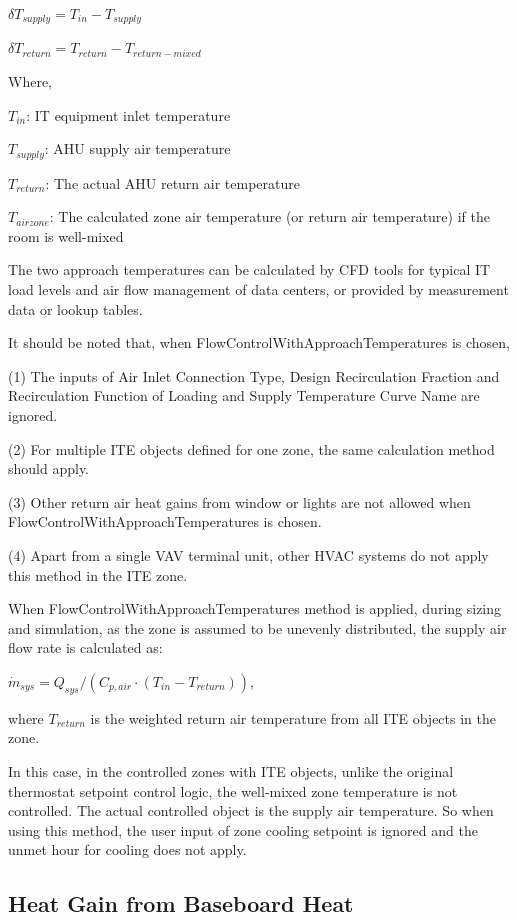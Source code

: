 $\delta T_{supply}=T_{in}-T_{supply}$

$\delta T_{return}=T_{return}-T_{return-mixed}$

Where, 

$T_{in}$: IT equipment inlet temperature

$T_{supply}$: AHU supply air temperature

$T_{return}$: The actual AHU return air temperature

$T_{airzone}$: The calculated zone air temperature (or return air temperature) if the room is well-mixed

The two approach temperatures can be calculated by CFD tools for typical IT load levels and air flow management of data centers, or provided by measurement data or lookup tables. 

It should be noted that, when FlowControlWithApproachTemperatures is chosen, 

(1) The inputs of Air Inlet Connection Type, Design Recirculation Fraction and Recirculation Function of Loading and Supply Temperature Curve Name are ignored.

(2) For multiple ITE objects defined for one zone, the same calculation method should apply. 

(3) Other return air heat gains from window or lights are not allowed when FlowControlWithApproachTemperatures is chosen.

(4) Apart from a single VAV terminal unit, other HVAC systems do not apply this method in the ITE zone.

When FlowControlWithApproachTemperatures method is applied, during sizing and simulation, as the zone is assumed to be unevenly distributed, the supply air flow rate is calculated as:

${\dot m_{sys}} = {Q_{sys}}/({C_{p,air}} \cdot ({T_{in}} - {T_{return}}))$,

where $T_{return}$ is the weighted return air temperature from all ITE objects in the zone. 

In this case, in the controlled zones with ITE objects, unlike the original thermostat setpoint control logic, the well-mixed zone temperature is not controlled. The actual controlled object is the supply air temperature. So when using this method, the user input of zone cooling setpoint is ignored and the unmet hour for cooling does not apply.

\subsection{Heat Gain from Baseboard Heat}\label{heat-gain-from-baseboard-heat}

